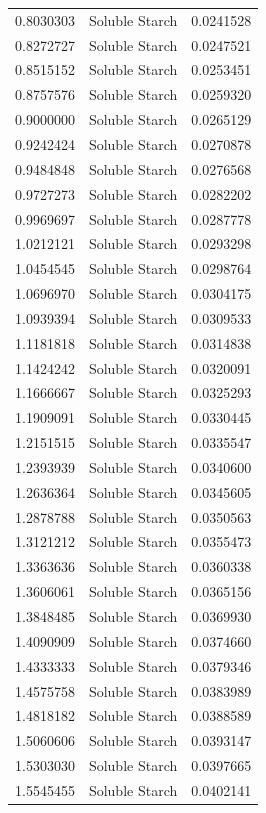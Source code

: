\documentclass[
  12pt,
]{article}
\begin{document}
{\begin{longtable}[]{@{}rlr@{}}
0.8030303 & Soluble Starch & 0.0241528 \\
0.8272727 & Soluble Starch & 0.0247521 \\
0.8515152 & Soluble Starch & 0.0253451 \\
0.8757576 & Soluble Starch & 0.0259320 \\
0.9000000 & Soluble Starch & 0.0265129 \\
0.9242424 & Soluble Starch & 0.0270878 \\
0.9484848 & Soluble Starch & 0.0276568 \\
0.9727273 & Soluble Starch & 0.0282202 \\
0.9969697 & Soluble Starch & 0.0287778 \\
1.0212121 & Soluble Starch & 0.0293298 \\
1.0454545 & Soluble Starch & 0.0298764 \\
1.0696970 & Soluble Starch & 0.0304175 \\
1.0939394 & Soluble Starch & 0.0309533 \\
1.1181818 & Soluble Starch & 0.0314838 \\
1.1424242 & Soluble Starch & 0.0320091 \\
1.1666667 & Soluble Starch & 0.0325293 \\
1.1909091 & Soluble Starch & 0.0330445 \\
1.2151515 & Soluble Starch & 0.0335547 \\
1.2393939 & Soluble Starch & 0.0340600 \\
1.2636364 & Soluble Starch & 0.0345605 \\
1.2878788 & Soluble Starch & 0.0350563 \\
1.3121212 & Soluble Starch & 0.0355473 \\
1.3363636 & Soluble Starch & 0.0360338 \\
1.3606061 & Soluble Starch & 0.0365156 \\
1.3848485 & Soluble Starch & 0.0369930 \\
1.4090909 & Soluble Starch & 0.0374660 \\
1.4333333 & Soluble Starch & 0.0379346 \\
1.4575758 & Soluble Starch & 0.0383989 \\
1.4818182 & Soluble Starch & 0.0388589 \\
1.5060606 & Soluble Starch & 0.0393147 \\
1.5303030 & Soluble Starch & 0.0397665 \\
1.5545455 & Soluble Starch & 0.0402141 \\

\end{longtable}}
\end{document}
